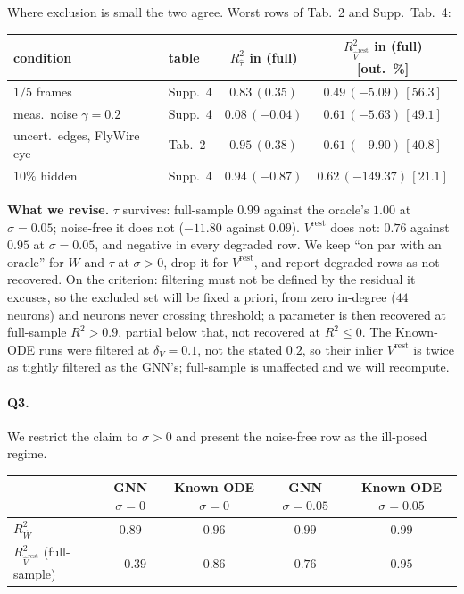 \documentclass[11pt]{article}
\newcommand{\Rw}{R^2_{\widehat W}}
\newcommand{\Rt}{R^2_{\hat\tau}}
\newcommand{\Rv}{R^2_{\hat V^{\mathrm{rest}}}}
\begin{document}
Where exclusion is small the two agree. Worst rows of Tab.~2 and Supp.~Tab.~4:

\begin{center}
{\footnotesize
\begin{tabular}{llcc}
\toprule
condition & table & $\Rt$ in (full) & $\Rv$ in (full) [out.\ \%] \\
\midrule
$1/5$ frames                & Supp.~4 & $0.83\,(0.35)$  & $0.49\,(-5.09)\,[56.3]$ \\
meas.\ noise $\gamma = 0.2$ & Supp.~4 & $0.08\,(-0.04)$ & $0.61\,(-5.63)\,[49.1]$ \\
uncert.\ edges, FlyWire eye & Tab.~2  & $0.95\,(0.38)$  & $0.61\,(-9.90)\,[40.8]$ \\
$10\%$ hidden               & Supp.~4 & $0.94\,(-0.87)$ & $0.62\,(-149.37)\,[21.1]$ \\
\bottomrule
\end{tabular}}
\end{center}

\textbf{What we revise.} $\tau$ survives: full-sample $0.99$ against the oracle's
$1.00$ at $\sigma = 0.05$; noise-free it does not ($-11.80$ against $0.09$).
$V^{\mathrm{rest}}$ does not: $0.76$ against $0.95$ at $\sigma = 0.05$, and
negative in every degraded row. We keep ``on par with an oracle'' for $W$ and
$\tau$ at $\sigma > 0$, drop it for $V^{\mathrm{rest}}$, and report degraded rows
as not recovered. On the criterion: filtering must not be defined by the residual
it excuses, so the excluded set will be fixed a priori, from zero in-degree ($44$
neurons) and neurons never crossing threshold; a parameter is then recovered at
full-sample $R^2 > 0.9$, partial below that, not recovered at $R^2 \leq 0$. The
Known-ODE runs were filtered at $\delta_V = 0.1$, not the stated $0.2$, so their
inlier $V^{\mathrm{rest}}$ is twice as tightly filtered as the GNN's; full-sample
is unaffected and we will recompute.

\paragraph{Q3.}
We restrict the claim to $\sigma > 0$ and present the noise-free row as the
ill-posed regime.

\begin{center}
{\footnotesize
\begin{tabular}{lcccc}
\toprule
& GNN $\sigma{=}0$ & Known ODE $\sigma{=}0$ & GNN $\sigma{=}0.05$ & Known ODE $\sigma{=}0.05$ \\
\midrule
$\Rw$               & $0.89$  & $0.96$ & $0.99$ & $0.99$ \\
$\Rv$ (full-sample) & $-0.39$ & $0.86$ & $0.76$ & $0.95$ \\
\bottomrule
\end{tabular}}
\end{center}
\end{document}
